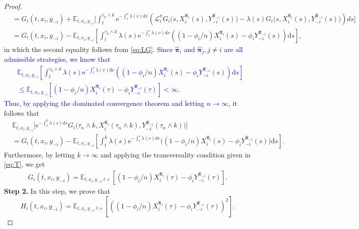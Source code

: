 \documentclass[11pt]{article}
\newcommand \drm {\mathrm{d}}
\newcommand \e {\mathrm{e}}
\numberwithin{equation}{section}
\newcommand{\blue}[1]{\textcolor{blue}{#1}}
\newcommand{\bpi}{\boldsymbol{\pi}}
\providecommand{\smn}{{-}} %
\begin{document}
\begin{proof}
\begin{align}
			&=G_i(t,x_i,y_{\smn i})+\mathbb{E}_{t,x_i,y_{\smn i}}\bigg[\int_t^{\tau_n\wedge k} \e^{-\int_t^s \lambda(v)\drm v}\left(\mathcal{L}_i^{\widehat{\pi}}G_i\big(s,X_i^{\widehat{\bm{\pi}}_i}(s),Y^{\widehat{\bpi}_{\smn i}}_{\smn i}(s)\big)-\lambda(s)G_i\big(s,X_i^{\widehat{\bm{\pi}}_i}(s),Y^{\widehat{\bpi}_{\smn i}}_{\smn i}(s)\big)\right)ds\bigg]\\
			&=G_i(t,x_i,y_{\smn i})-\mathbb{E}_{t,x_i,y_{\smn i}}\left[\int_t^{\tau_n\wedge k} \lambda(s)\e^{-\int_t^s \lambda(v)\drm v}\left((1-\phi_i/n)X^{\widehat{\bm{\pi}}_i}_i(s)-\phi_iY^{\widehat{\bpi}_{\smn i}}_{\smn i}(s)\right)\drm s\right],
		\end{align}
in which the second equality follows from \eqref{eq:LG}. \blue{Since $\widehat{\bm{\pi}}_i$ and $\widehat{\bm{\pi}}_j, j\neq i$ are all admissible strategies, we know that
\begin{align}
& \mathbb{E}_{t,x_i,y_{\smn i}}\left[\int_t^{\tau_n\wedge k} \lambda(s)\e^{-\int_t^s \lambda(v)\drm v}\left((1-\phi_i/n)X^{\widehat{\bm{\pi}}_i}_i(s)-\phi_iY^{\widehat{\bpi}_{\smn i}}_{\smn i}(s)\right)\drm s\right] \\
&\le \mathbb{E}_{t,x_i,y_{\smn i}}\left[(1-\phi_i/n)X^{\widehat{\bm{\pi}}_i}_i(\tau)-\phi_iY^{\widehat{\bpi}_{\smn i}}_{\smn i}(\tau)\right] < \infty.
\end{align}
Thus, by applying the dominated convergence theorem and letting \(n\to\infty\),} it follows that
\begin{align}
	&	\mathbb{E}_{t,x_i,y_{\smn i}}\Big[\e^{-\int_t^{k}\lambda(s)\drm s} G_i\big(\tau_n\wedge k,X_i^{\widehat{\bm{\pi}}_i}(\tau_n\wedge k),Y^{\widehat{\bpi}_{\smn i}}_{\smn i}(\tau_n\wedge k)\big)\Big]\\
	&=G_i(t,x_i,y_{\smn i})-\mathbb{E}_{t,x_i,y_{\smn i}}\left[\int_t^{ k} \lambda(s)\e^{-\int_t^s \lambda(v)\drm v}\big((1-\phi_i/n)X^{\widehat{\bm{\pi}}_i}_i(s)-\phi_iY^{\widehat{\bpi}_{\smn i}}_{\smn i}(s)\big)\drm s\right].
\end{align}
Furthermore,  by letting  \(k \to \infty\) and applying the transversality condition given in \eqref{eq:T}, we get
		\begin{align}
			G_i(t,x_i,y_{\smn i})=\mathbb{E}_{t,x_i,y_{\smn i},t+}\left[(1-\phi_i/n)X_i^{\widehat{\bm{\pi}}_i}(\tau)-\phi_i Y^{\widehat{\bpi}_{\smn i}}_{\smn i}(\tau)\right].
		\end{align}	
{\bf{Step 2.}} In this step, we prove that
	\[
	H_i(t,x_i,y_{\smn i})=\mathbb{E}_{t,x_i,y_{\smn i},t+}\left[\left((1-\phi_i/n)X_i^{\widehat{\bm{\pi}}_i}(\tau)
	-\phi_i Y^{\widehat{\bpi}_{\smn i}}_{\smn i}(\tau)\right)^2\right].
\]
\end{proof}
\end{document}
